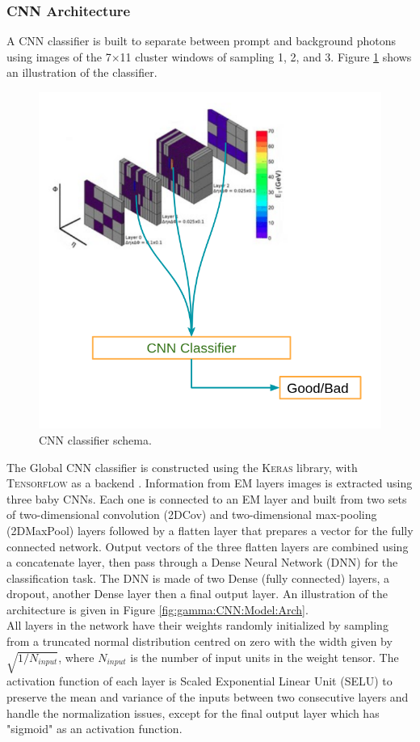 \subsubsection{CNN Architecture}
\label{gamma:CNN:Model}
A CNN classifier is built to separate between prompt and background photons using images of the 7$\times$11 cluster windows of sampling 1, 2, and 3. Figure \ref{fig:gamma:CNN:Model:Idea} shows an illustration of the classifier.
\begin{figure}[htbp]
    \centering
    \includegraphics[width=.55\textwidth]{Ch3/Img/CNN_Idea.png}
    \begin{tcolorbox}[colback=black!5!white,colframe=white!75!black]
    \caption{CNN classifier schema.}
    \label{fig:gamma:CNN:Model:Idea}
    \end{tcolorbox}
\end{figure}
The Global CNN classifier is constructed using the \textsc{Keras} library, with \textsc{Tensorflow} as a backend \cite{keras, tensorflow}. Information from EM layers images is extracted using three baby CNNs. Each one is connected to an EM layer and built from two sets of two-dimensional convolution (2DCov) and two-dimensional max-pooling (2DMaxPool) \cite{maxpooling} layers followed by a flatten layer that prepares a vector for the fully connected network. Output vectors of the three flatten layers are combined using a concatenate layer, then pass through a Dense Neural Network (DNN) for the classification task. The DNN is made of two Dense (fully connected) layers, a dropout, another Dense layer then a final output layer. An illustration of the architecture is given in Figure \ref{fig:gamma:CNN:Model:Arch}. \\
All layers in the network have their weights randomly initialized by sampling from a truncated normal distribution centred on zero with the width given by $\sqrt{1/N_{input}}$, where $N_{input}$ is the number of input units in the weight tensor. The activation function of each layer is Scaled Exponential Linear Unit (SELU) \cite{SELU} to preserve the mean and variance of the inputs between two consecutive layers and handle the normalization issues, except for the final output layer which has "sigmoid" as an activation function.\\
